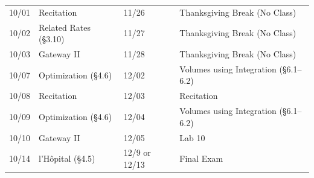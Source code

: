 \documentclass[11pt,letterpaper]{article}
\begin{document}
\begin{table}[!ht]
{\begin{tabular}{ll || ll}
	10/01 & Recitation & 11/26 & Thanksgiving Break (No Class) \\
	10/02 & Related Rates (\S3.10) & 11/27 & Thanksgiving Break (No Class) \\
	10/03 & Gateway II & 11/28 & Thanksgiving Break (No Class) \\
	10/07 & Optimization (\S4.6) & 12/02 & Volumes using Integration (\S6.1--6.2) \\
	10/08 & Recitation & 12/03 & Recitation \\	
	10/09 & Optimization (\S4.6) & 12/04 & Volumes using Integration (\S6.1--6.2) \\
	10/10 & Gateway II & 12/05 & Lab 10 \\
	10/14 & l'H\^{o}pital (\S4.5) & 12/9 or 12/13 & Final Exam
        \end{tabular}
        }
        \end{table}
\end{document}
